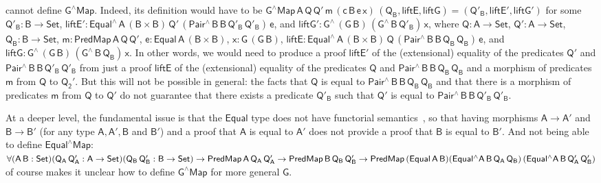 \documentclass[9pt]{entcs}
\begin{document}
cannot define $\mathsf{G^\wedge Map}$. Indeed, its definition would
have to be $ \mathsf{G^\wedge Map\,A\,Q\,Q'\,m\,(c\,B\,e\,x)\,(Q_B,
  liftE, liftG) = (Q'_B, liftE', liftG')}$ for some $\mathsf{Q'_B : B
  \to Set}$, $\mathsf{liftE' : Equal^{\wedge}\,A\,(B \times
  B)\,Q'\,(Pair^{\wedge}\,B\,B\,Q'_B\,Q'_B)\,e}$, and $\mathsf{liftG'
  : G^{\wedge}\,(G\,B)\,(G^{\wedge}\,B\,Q'_B)\,x}$, where $\mathsf{Q :
  A \to Set}$, $\mathsf{Q' : A \to Set}$, $\mathsf{Q_B : B \to Set}$,
$\mathsf{m : PredMap\,A\,Q\,Q'}$, $\mathsf{e : Equal\,A\,(B \times
  B)}$, $\mathsf{x : G\,(G\,B)}$, $\mathsf{liftE :
  Equal^{\wedge}\,A\,(B \times
  B)\,Q\,(Pair^{\wedge}\,B\,B\,Q_B\,Q_B)\,e}$, and $\mathsf{liftG :
  G^{\wedge}\,(G\,B)\,(G^{\wedge}\,B\,Q_B)\,x}$. In other words, we
would need to produce a proof $\mathsf{liftE'}$ of the (extensional)
equality of the predicates $\mathsf{Q'}$ and
$\mathsf{Pair^{\wedge}\,B\,B\,Q'_B\,Q'_B}$ from just a proof
$\mathsf{liftE}$ of the (extensional) equality of the predicates
$\mathsf{Q}$ and $\mathsf{Pair^{\wedge}\,B\,B\,Q_B\,Q_B}$ and a
morphism of predicates $\mathsf{m}$ from $\mathsf{Q}$ to
$\mathsf{Q_2'}$.
But this will not be possible in general: the facts that $\mathsf{Q}$
is equal to $\mathsf{Pair^{\wedge}\,B\,B\,Q_B\,Q_B}$ and that there is
a morphism of predicates $\mathsf{m}$ from $\mathsf{Q}$ to
$\mathsf{Q'}$ do not guarantee that there exists a predicate
$\mathsf{Q'_B}$ such that $\mathsf{Q'}$ is equal to
$\mathsf{Pair^{\wedge}\,B\,B\,Q'_B\,Q'_B}$.

At a deeper level, the fundamental issue is that the $\mathsf{Equal}$
type does not have functorial semantics~\cite{jgj21}, so that having
morphisms $\mathsf{A \to A'}$ and $\mathsf{B \to B'}$ (for any type
$\mathsf{A, A', B}$ and $\mathsf{B'}$) and a proof that $\mathsf{A}$
is equal to $\mathsf{A'}$ does not provide a proof that $\mathsf{B}$
is equal to $\mathsf{B'}$. And not being able to define
$\mathsf{Equal^\wedge Map :}$ $\mathsf{\forall (A\, B : Set) (Q_A\,
  Q_A' : A \to Set) (Q_B\, Q_B' : B \to Set) \to PredMap\,A\,Q_A\,Q_A'
  \to PredMap\,B\,Q_B\,Q_B' \to
  PredMap\,(Equal\,A\,B)}\\ \mathsf{(Equal^\wedge
  A\,B\,Q_A\,Q_B)\,(Equal^\wedge A\,B\,Q_A'\,Q_B')}$ of course makes
it unclear how to define $\mathsf{G^\wedge Map}$ for more general
$\mathsf{G}$.
\end{document}
